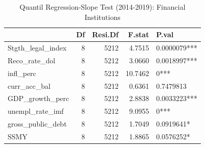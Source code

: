 \begin{table}[ht]
\centering
\caption{Quantil Regression-Slope Test (2014-2019): Financial Institutions} 
\begingroup\small
\begin{tabular}{lrrrl}
  \toprule
 & Df & Resi.Df & F.stat & P.val \\ 
  \midrule
Stgth\_legal\_index & 8 & 5212 & 4.7515 & 0.0000079*** \\ 
  Reco\_rate\_dol & 8 & 5212 & 3.0660 & 0.0018997*** \\ 
  infl\_perc & 8 & 5212 & 10.7462 & 0*** \\ 
  curr\_acc\_bal & 8 & 5212 & 0.6361 & 0.7479813 \\ 
  GDP\_growth\_perc & 8 & 5212 & 2.8838 & 0.0033223*** \\ 
  unempl\_rate\_imf & 8 & 5212 & 9.0955 & 0*** \\ 
  gross\_public\_debt & 8 & 5212 & 1.7049 & 0.0919641* \\ 
  SSMY & 8 & 5212 & 1.8865 & 0.0576252* \\ 
   \bottomrule
\end{tabular}
\endgroup
\end{table}

